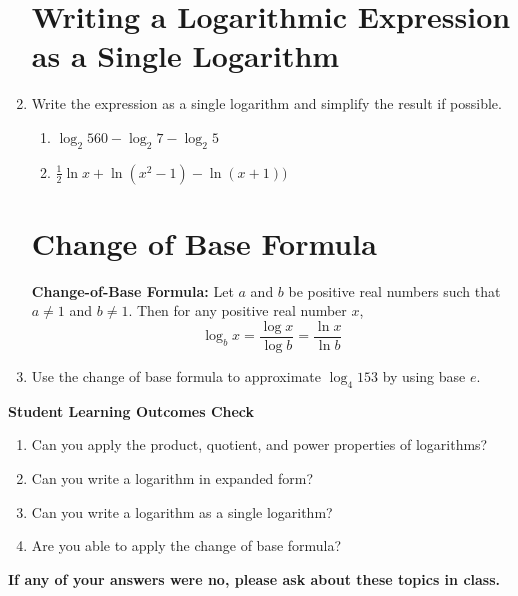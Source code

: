 \documentclass[11pt]{article}
\begin{document}
\begin{enumerate}
\newpage

\section{Writing a Logarithmic Expression as a Single Logarithm}
\item Write the expression as a single logarithm and simplify the result if possible.
\begin{enumerate}
\item $\log_2 560 - \log_2 7- \log_2 5$\\[1.5in]
\item $\frac{1}{2} \ln x + \ln (x^2-1)- \ln(x+1))$\\[1.5in]
\end{enumerate}



\section{Change of Base Formula}
\noindent \textbf{Change-of-Base Formula: } Let $a$ and $b$ be positive real numbers such that $a \neq 1$ and $b \neq 1.$  Then for any positive real number $x$,
$$\log_b x=\frac{\log x}{\log b}=\frac{\ln x}{\ln b}$$


\item Use the change of base formula to approximate $\log_4 153$ by using base $e$.\vfill

\end{enumerate}

\noindent \textbf{Student Learning Outcomes Check}

\begin{enumerate}
\item Can you apply the product, quotient, and power properties of logarithms?
\item Can you write a logarithm in expanded form?
\item Can you write a logarithm as a single logarithm?
\item Are you able to apply the change of base formula?
\end{enumerate}

\noindent \textbf{If any of your answers were no, please ask about these topics in class.}
\end{document}
